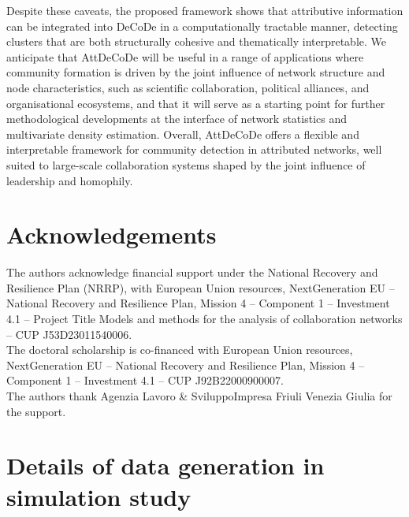 \documentclass[11pt]{article}
\begin{document}
Despite these caveats, the proposed framework shows that attributive information can be integrated into DeCoDe in a computationally tractable manner, detecting clusters that are both structurally cohesive and thematically interpretable. We anticipate that AttDeCoDe will be useful in a range of applications where community formation is driven by the joint influence of network structure and node characteristics, such as scientific collaboration, political alliances, and organisational ecosystems, and that it will serve as a starting point for further methodological developments at the interface of network statistics and multivariate density estimation.
Overall, AttDeCoDe offers a flexible and interpretable framework for community detection in attributed networks, well suited to large-scale collaboration systems shaped by the joint influence of leadership and homophily.

\clearpage

\section*{Acknowledgements}

The authors acknowledge financial support under the National Recovery and Resilience Plan (NRRP), with European Union resources, NextGeneration EU -- National Recovery and Resilience Plan, Mission 4 -- Component 1 -- Investment 4.1 -- Project Title Models and methods for the analysis of collaboration networks -- CUP J53D23011540006.\\

The doctoral scholarship is co-financed with European Union resources, NextGeneration EU -- National Recovery and Resilience Plan, Mission 4 -- Component 1 -- Investment 4.1 -- CUP J92B22000900007. \\

The authors thank Agenzia Lavoro \& SviluppoImpresa Friuli Venezia Giulia for the support.

\clearpage




\clearpage

\appendix

\section{Details of data generation in simulation study}\label{sec:appendix:sim_details}
\end{document}

